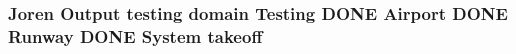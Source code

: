 \subsubsection[{\texorpdfstring{takeoff}{takeoff}}]{\setlength{\rightskip}{0pt plus 5cm}Joren Output testing domain Testing D\+O\+NE {\bf Airport} D\+O\+NE {\bf Runway} D\+O\+NE {\bf System} takeoff}\hypertarget{Verdeling_8txt_a79276dc93193eff1d7f9ab69fa134955}{}\label{Verdeling_8txt_a79276dc93193eff1d7f9ab69fa134955}
